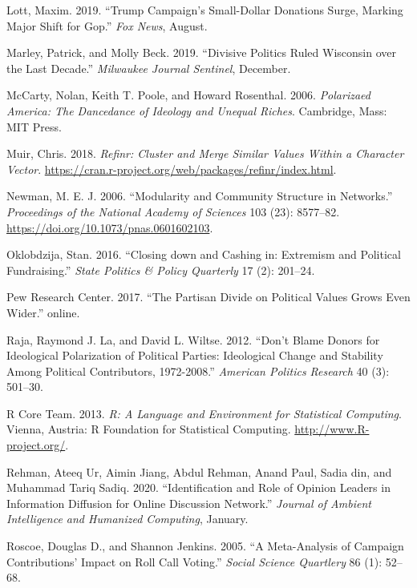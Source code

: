 \documentclass[12pt,]{article}
\begin{document}
\leavevmode\hypertarget{ref-lott2019}{}%
Lott, Maxim. 2019. ``Trump Campaign's Small-Dollar Donations Surge,
Marking Major Shift for Gop.'' \emph{Fox News}, August.

\leavevmode\hypertarget{ref-marley2019}{}%
Marley, Patrick, and Molly Beck. 2019. ``Divisive Politics Ruled
Wisconsin over the Last Decade.'' \emph{Milwaukee Journal Sentinel},
December.

\leavevmode\hypertarget{ref-mccarty2006}{}%
McCarty, Nolan, Keith T. Poole, and Howard Rosenthal. 2006.
\emph{Polarizaed America: The Dancedance of Ideology and Unequal
Riches}. Cambridge, Mass: MIT Press.

\leavevmode\hypertarget{ref-refinr}{}%
Muir, Chris. 2018. \emph{Refinr: Cluster and Merge Similar Values Within
a Character Vector}.
\url{https://cran.r-project.org/web/packages/refinr/index.html}.

\leavevmode\hypertarget{ref-newman2006}{}%
Newman, M. E. J. 2006. ``Modularity and Community Structure in
Networks.'' \emph{Proceedings of the National Academy of Sciences} 103
(23): 8577--82. \url{https://doi.org/10.1073/pnas.0601602103}.

\leavevmode\hypertarget{ref-oklobzija}{}%
Oklobdzija, Stan. 2016. ``Closing down and Cashing in: Extremism and
Political Fundraising.'' \emph{State Politics \& Policy Quarterly} 17
(2): 201--24.

\leavevmode\hypertarget{ref-pew2017}{}%
Pew Research Center. 2017. ``The Partisan Divide on Political Values
Grows Even Wider.'' online.

\leavevmode\hypertarget{ref-laraja2011}{}%
Raja, Raymond J. La, and David L. Wiltse. 2012. ``Don't Blame Donors for
Ideological Polarization of Political Parties: Ideological Change and
Stability Among Political Contributors, 1972-2008.'' \emph{American
Politics Research} 40 (3): 501--30.

\leavevmode\hypertarget{ref-r}{}%
R Core Team. 2013. \emph{R: A Language and Environment for Statistical
Computing}. Vienna, Austria: R Foundation for Statistical Computing.
\url{http://www.R-project.org/}.

\leavevmode\hypertarget{ref-rehman2020}{}%
Rehman, Ateeq Ur, Aimin Jiang, Abdul Rehman, Anand Paul, Sadia din, and
Muhammad Tariq Sadiq. 2020. ``Identification and Role of Opinion Leaders
in Information Diffusion for Online Discussion Network.'' \emph{Journal
of Ambient Intelligence and Humanized Computing}, January.

\leavevmode\hypertarget{ref-roscoe2005}{}%
Roscoe, Douglas D., and Shannon Jenkins. 2005. ``A Meta-Analysis of
Campaign Contributions' Impact on Roll Call Voting.'' \emph{Social
Science Quartlery} 86 (1): 52--68.
\end{document}
